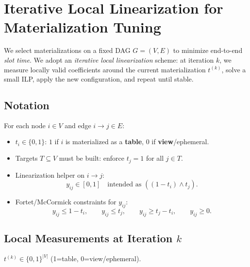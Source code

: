 \section{Iterative Local Linearization for Materialization Tuning}\label{sec:ilp}




We select materializations on a fixed DAG $G=(V,E)$ to minimize end-to-end \emph{slot time}.  
We adopt an \emph{iterative local linearization} scheme: at iteration $k$, we measure
locally valid coefficients around the current materialization $t^{(k)}$, solve a
small ILP, apply the new configuration, and repeat until stable.

\subsection{Notation}
For each node $i\in V$ and edge $i \rightarrow j\in E$:
\begin{itemize}
  \item $t_i\in\{0,1\}$: $1$ if $i$ is materialized as a \textbf{table}, $0$ if \textbf{view}/ephemeral.
  \item Targets $T\subseteq V$ must be built: enforce $t_j=1$ for all $j\in T$.
  \item Linearization helper on $i \rightarrow j$:
  \[
     y_{ij}\in[0,1] \quad \text{intended as } ((1-t_i)\wedge t_j).
  \]
  \item Fortet/McCormick constraints for $y_{ij}$:
  \[
  y_{ij}\le 1-t_i,\qquad y_{ij}\le t_j,\qquad y_{ij}\ge t_j - t_i,\qquad y_{ij}\ge 0.
  \]
\end{itemize}

\subsection{Local Measurements at Iteration $k$}

 $t^{(k)} \in\{0,1\}^{|V|}$ (1=table, 0=view/ephemeral).

